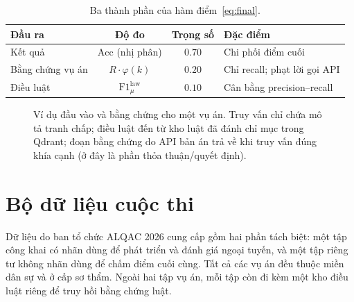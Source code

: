 \documentclass[conference]{IEEEtran}
\begin{document}
\begin{table}[t]
  \centering
  \caption{Ba thành phần của hàm điểm~\eqref{eq:final}.}
  \label{tab:metrics}
  \footnotesize
  \begin{tabular}{@{}l c c l@{}}
    \toprule
    \textbf{Đầu ra} & \textbf{Độ đo} & \textbf{Trọng số} & \textbf{Đặc điểm} \\
    \midrule
    Kết quả          & $\mathrm{Acc}$ (nhị phân)      & $0.70$ & Chi phối điểm cuối \\
    Bằng chứng vụ án & $R\cdot\varphi(k)$             & $0.20$ & Chỉ recall; phạt lời gọi API \\
    Điều luật        & $\mathrm{F1}^{\text{law}}_{\mu}$ & $0.10$ & Cân bằng precision--recall \\
    \bottomrule
  \end{tabular}
\end{table}

\begin{figure}[H]
  \centering
  \footnotesize
  \caption{Ví dụ đầu vào và bằng chứng cho một vụ án. Truy vấn chỉ chứa mô tả tranh chấp; điều luật đến từ kho luật đã đánh chỉ mục trong Qdrant; đoạn bằng chứng do API bản án trả về khi truy vấn đúng khía cạnh (ở đây là phần thỏa thuận/quyết định).}
  \label{fig:sample}
\end{figure}

\section{Bộ dữ liệu cuộc thi}
\label{sec:dataset}
Dữ liệu do ban tổ chức ALQAC 2026 cung cấp gồm hai phần tách biệt: một tập công
khai có nhãn dùng để phát triển và đánh giá ngoại tuyến, và một tập riêng tư
không nhãn dùng để chấm điểm cuối cùng. Tất cả các vụ án đều thuộc miền dân sự và
ở cấp sơ thẩm. Ngoài hai tập vụ án, mỗi tập còn đi kèm một kho điều luật riêng để
truy hồi bằng chứng luật.
\end{document}
